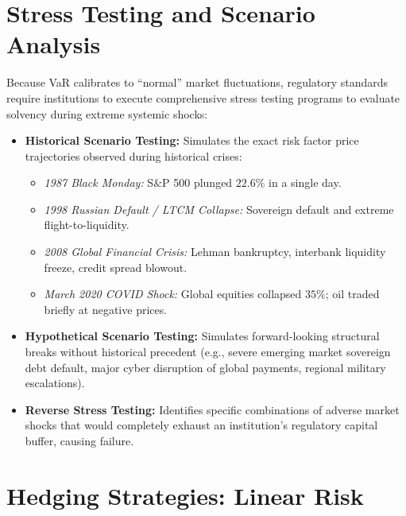 \section{Stress Testing and Scenario Analysis}

Because VaR calibrates to ``normal'' market fluctuations, regulatory standards require institutions to execute comprehensive stress testing programs to evaluate solvency during extreme systemic shocks:
\begin{itemize}[leftmargin=1.5em, itemsep=2pt]
    \item \textbf{Historical Scenario Testing:} Simulates the exact risk factor price trajectories observed during historical crises:
    \begin{itemize}
        \item \textit{1987 Black Monday:} S\&P 500 plunged $22.6\%$ in a single day.
        \item \textit{1998 Russian Default / LTCM Collapse:} Sovereign default and extreme flight-to-liquidity.
        \item \textit{2008 Global Financial Crisis:} Lehman bankruptcy, interbank liquidity freeze, credit spread blowout.
        \item \textit{March 2020 COVID Shock:} Global equities collapsed $35\%$; oil traded briefly at negative prices.
    \end{itemize}
    \item \textbf{Hypothetical Scenario Testing:} Simulates forward-looking structural breaks without historical precedent (e.g., severe emerging market sovereign debt default, major cyber disruption of global payments, regional military escalations).
    \item \textbf{Reverse Stress Testing:} Identifies specific combinations of adverse market shocks that would completely exhaust an institution's regulatory capital buffer, causing failure.
\end{itemize}

\section{Hedging Strategies: Linear Risk}

